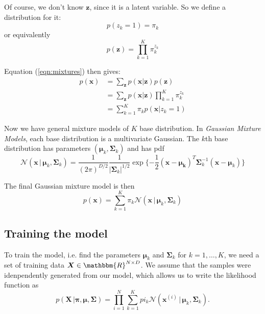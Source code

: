\documentclass[final,3p,times]{elsarticle}
\begin{document}
Of course, we don't know $\boldsymbol{z}$, since it is a latent variable. So we define a distribution for it: 
\begin{equation}
p(z_k = 1) = \pi_k
\end{equation}
or equivalently
\begin{equation}
p(\boldsymbol{z}) = \prod_{k=1}^K \pi_k^{z_k}
\end{equation} 

Equation (\ref{eqn:mixtures}) then gives:
\begin{equation}
\begin{split}
p(\boldsymbol{x}) & = \sum_{\boldsymbol{z}} p(\boldsymbol{x}|\boldsymbol{z})p(\boldsymbol{z}) \\
& = \sum_{\boldsymbol{z}} p(\boldsymbol{x}|\boldsymbol{z}) \prod_{k=1}^K \pi_k^{z_k} \\
& = \sum_{k = 1}^K \pi_k p(\boldsymbol{x}|z_k = 1)
\end{split}
\end{equation}

Now we have general mixture models of $K$ base distribution. In \emph{Gaussian Mixture Models}, each base distribution is a multivariate Gaussian. The $k$th base distribution has parameters $(\boldsymbol{\mu}_k, \boldsymbol{\Sigma}_k)$ and has pdf
\begin{equation}
\label{eqn:MVG}
\mathcal{N}(\boldsymbol{x}\,|\,\boldsymbol{\mu}_k, \boldsymbol{\Sigma}_k) = \frac{1}{(2\pi)^{D/2}}\frac{1}{|\boldsymbol{\Sigma}_k|^{1/2}}
\exp{\{-\frac{1}{2}(\boldsymbol{x}-\boldsymbol{\mu_k})^T \boldsymbol{\Sigma}_k^{-1}(\boldsymbol{x}-\boldsymbol{\mu}_k) \}}
\end{equation}

The final Gaussian mixture model is then
\begin{equation}
\label{eqn:GMM}
p(\boldsymbol{x}) = \sum_{k = 1}^K \pi_k \mathcal{N}(\boldsymbol{x}\,|\,\boldsymbol{\mu}_k, \boldsymbol{\Sigma}_k)
\end{equation}

\subsection*{Training the model}
\label{sect:GMM-train}

To train the model, i.e. find the parameters $\boldsymbol{\mu}_k$ and $\boldsymbol{\Sigma}_k$ for $ k = 1,\dots, K$, we need a set of training data $\boldsymbol{X} \in \mathbbm{R}^{N\times D}$. We assume that the samples were idenpendently generated from our model, which allows us to write the likelihood function as
\begin{equation}
\label{eqn:GMM-likelihood}
p(\boldsymbol{X}\,|\boldsymbol{\pi},\boldsymbol{\mu},\boldsymbol{\Sigma}) = \prod_{i=1}^N\sum_{k=1}^K pi_k
 \mathcal{N}(\boldsymbol{x}^{(i)}\,|\,\boldsymbol{\mu}_k, \boldsymbol{\Sigma}_k).
\end{equation}
\end{document}
